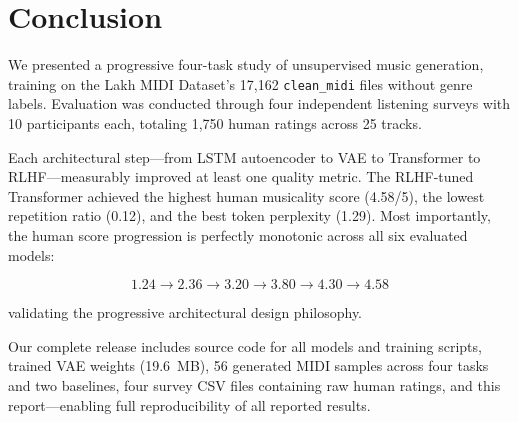 \documentclass[conference]{IEEEtran}
\begin{document}
\section{Conclusion}

We presented a progressive four-task study of unsupervised music generation, training on the Lakh MIDI Dataset's 17,162 \texttt{clean\_midi} files without genre labels. Evaluation was conducted through four independent listening surveys with 10 participants each, totaling 1,750 human ratings across 25 tracks.

Each architectural step---from LSTM autoencoder to VAE to Transformer to RLHF---measurably improved at least one quality metric. The RLHF-tuned Transformer achieved the highest human musicality score (4.58/5), the lowest repetition ratio (0.12), and the best token perplexity (1.29). Most importantly, the human score progression is perfectly monotonic across all six evaluated models:

\begin{equation*}
1.24 \to 2.36 \to 3.20 \to 3.80 \to 4.30 \to 4.58
\end{equation*}

validating the progressive architectural design philosophy.

Our complete release includes source code for all models and training scripts, trained VAE weights (19.6~MB), 56 generated MIDI samples across four tasks and two baselines, four survey CSV files containing raw human ratings, and this report---enabling full reproducibility of all reported results.
\end{document}

